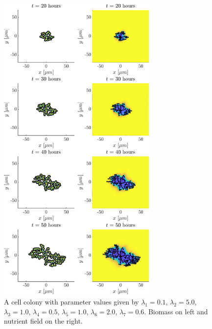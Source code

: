 \begin{figure}[!htb] %
    \centering
    \includegraphics[width= 0.7\textwidth]{
        chapter2/figures/t_all__L1_0o10_L2_5o00_L3_1o00_L4_0o50_L5_1o00_L6_2o00_L7_0o60.pdf}
    \caption{A cell colony with parameter values given by
             $\lambda_1 = 0.1$,  
             $\lambda_2 = 5.0$, 
             $\lambda_3 = 1.0$, 
             $\lambda_4 = 0.5$, 
             $\lambda_5 = 1.0$, 
             $\lambda_6 = 2.0$, 
             $\lambda_7 = 0.6$. 
             Biomass on left and nutrient field on the right.}
    \label{fig: sdsd}
\end{figure}




